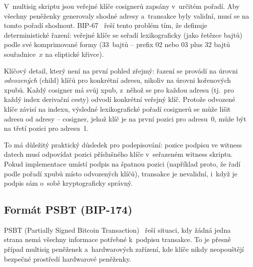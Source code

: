 V~multisig skriptu jsou veřejné klíče cosignerů zapsány v~určitém pořadí.
Aby všechny peněženky generovaly shodné adresy a~transakce byly validní,
musí se na tomto pořadí shodnout. BIP-67~\citep{BIP67} řeší tento problém
tím, že definuje deterministické řazení: veřejné klíče se seřadí
lexikograficky (jako řetězce bajtů) podle své komprimované formy
(33~bajtů -- prefix 02 nebo 03 plus 32 bajtů souřadnice~$x$ na eliptické
křivce).

Klíčový detail, který není na první pohled zřejmý: řazení se provádí
na úrovni \emph{odvozených} (child) klíčů pro konkrétní adresu, nikoliv
na úrovni kořenových xpubů. Každý cosigner má svůj xpub, z~něhož se
pro každou adresu (tj.\ pro každý index derivační cesty) odvodí konkrétní
veřejný klíč. Protože odvozené klíče závisí na indexu, výsledné
lexikografické pořadí cosignerů se může lišit adresu od adresy -- cosigner,
jehož klíč je na první pozici pro adresu~0, může být na třetí pozici
pro adresu~1.

To má důležitý praktický důsledek pro podepisování: pozice podpisu ve
witness datech musí odpovídat pozici příslušného klíče v~seřazeném
witness skriptu. Pokud implementace umístí podpis na špatnou pozici
(například proto, že řadí podle pořadí xpubů místo odvozených klíčů),
transakce je nevalidní, i~když je podpis sám o~sobě kryptograficky
správný.

\subsection{Formát PSBT (BIP-174)}
\label{sec:psbt}

PSBT (Partially Signed Bitcoin Transaction)~\citep{BIP174} řeší situaci,
kdy žádná jedna strana nemá všechny informace potřebné k~podpisu transakce.
To je přesně případ multisig peněženek a~hardwarových zařízení, kde klíče
nikdy neopouštějí bezpečné prostředí hardwarové peněženky.


